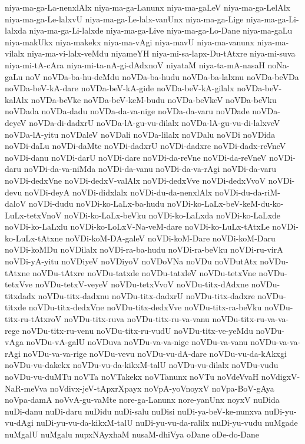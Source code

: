 {niya-ma-ga-La-nenxlAlx
niya-ma-ga-Lanunx
niya-ma-gaLeV
niya-ma-ga-LelAlx
niya-ma-ga-Le-lalxvU
niya-ma-ga-Le-lalx-vanUnx
niya-ma-ga-Lige
niya-ma-ga-Li-lalxda
niya-ma-ga-Li-lalxde
niya-ma-ga-Live
niya-ma-ga-Lo-Dane
niya-ma-gaLu
niya-makUkx
niya-makekx
niya-ma-vAgi
niya-mavU
niya-ma-vanunx
niya-ma-vilalx
niya-ma-vi-lalx-veMdu
niyameYH
niya-mi-sa-lapx-Du-tAtxre
niya-mi-suva
niya-mi-tA-cAra
niya-mi-ta-nA-gi-dAdxnoV
niyataM
niya-ta-mA-nasaH
noNa-gaLu
noV
noVDa-ba-hu-deMdu
noVDa-ba-hudu
noVDa-ba-lalxnu
noVDa-beVDa
noVDa-beV-kA-dare
noVDa-beV-kA-gide
noVDa-beV-kA-gilalx
noVDa-beV-kalAlx
noVDa-beVke
noVDa-beV-keM-budu
noVDa-beVkeV
noVDa-beVku
noVDada
noVDa-dadu
noVDa-da-va-nige
noVDa-da-varu
noVDade
noVDa-deyeV
noVDa-di-dadxrU
noVDa-lA-gu-vu-dilalx
noVDa-lA-gu-vu-di-lalxveV
noVDa-lA-yitu
noVDaleV
noVDali
noVDa-lilalx
noVDalu
noVDi
noVDida
noVDi-daLu
noVDi-daMte
noVDi-dadxrU
noVDi-dadxre
noVDi-dadx-reVneV
noVDi-danu
noVDi-darU
noVDi-dare
noVDi-da-reVne
noVDi-da-reVneV
noVDi-daru
noVDi-da-va-niMda
noVDi-da-vanu
noVDi-da-va-rAgi
noVDi-da-varu
noVDi-dedxVne
noVDi-dedxV-valAlx
noVDi-dedxVve
noVDi-dedxVvoV
noVDi-devu
noVDi-deyA
noVDi-didxlalx
noVDi-du-da-nenxlAlx
noVDi-du-da-riM-daloV
noVDi-dudu
noVDi-ko-LaLx-ba-hudu
noVDi-ko-LaLx-beV-keM-du-ko-LuLx-tetxVnoV
noVDi-ko-LaLx-beVku
noVDi-ko-LaLxda
noVDi-ko-LaLxde
noVDi-ko-LaLxlu
noVDi-ko-LoLxV-Na-veM-dare
noVDi-ko-LuLx-tAtxLe
noVDi-ko-LuLx-tAtxne
noVDi-koM-DA-galeV
noVDi-koM-Dare
noVDi-koM-Daru
noVDi-koMDu
noVDilalx
noVDi-ra-ba-hudu
noVDi-ra-beVku
noVDi-ru-virA
noVDi-yA-yitu
noVDiyeV
noVDiyoV
noVDoVNa
noVDu
noVDutAtx
noVDu-tAtxne
noVDu-tAtxre
noVDu-tatxde
noVDu-tatxleV
noVDu-tetxVne
noVDu-tetxVve
noVDu-tetxV-veyeV
noVDu-tetxVvoV
noVDu-titx-dAdxne
noVDu-titxdadx
noVDu-titx-dadxnu
noVDu-titx-dadxrU
noVDu-titx-dadxre
noVDu-titxde
noVDu-titx-dedxVne
noVDu-titx-dedxVve
noVDu-titx-ra-beVku
noVDu-titx-ru-tAtxroV
noVDu-titx-ruva
noVDu-titx-ru-va-vanu
noVDu-titx-ru-va-va-rege
noVDu-titx-ru-venu
noVDu-titx-ru-vudU
noVDu-titx-ve-yeMdu
noVDu-vAga
noVDu-vA-galU
noVDuva
noVDu-va-va-nige
noVDu-va-vanu
noVDu-va-va-rAgi
noVDu-va-va-rige
noVDu-vevu
noVDu-vu-dA-dare
noVDu-vu-da-kAkxgi
noVDu-vu-dakekx
noVDu-vu-da-kikxM-talU
noVDu-vu-dilalx
noVDu-vudu
noVDu-vu-duMTu
noVTa
noVTakekx
noVTanunx
noVTu
noVdeVvaH
noVdigxV-NaR-meVva
noVdivx-jeV-tApxrXpayx
noVpA-yoVnoyxV
noVpa-BoV-gAya
noVpa-damA
noVvA-gu-vaMte
nore-ga-Lanunx
nore-yanUnx
noyxV
nuDida
nuDi-danu
nuDi-daru
nuDidu
nuDi-salu
nuDisi
nuDi-ya-beV-ke-nunxva
nuDi-yu-vu-dAgi
nuDi-yu-vu-da-kikxM-talU
nuDi-yu-vu-da-ralilx
nuDi-yu-vudu
nuMgade
nuMgalU
nuMgalu
nupxNAyxhaM
nusaM-dhiVya
oDane
oDe-do-Dane
}
